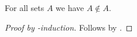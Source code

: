 \begin{proposition}\label{in_irrefl}
    For all sets $A$ we have $A\not\in A$.
\end{proposition}
\begin{proof}[Proof by \in-induction]
    Follows by \auto.
\end{proof}
